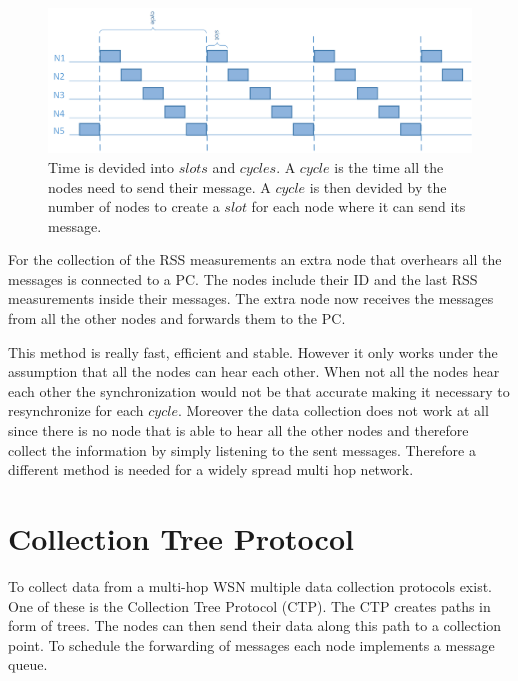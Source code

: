\begin{figure}[htbp]
	\centering
    \includegraphics[scale=0.8]{content/images/Multispin}
   	\caption{Time is devided into $slots$ and $cycles$. A $cycle$ is the time all the nodes need to send their message. A $cycle$ is then devided by the number of nodes to create a $slot$ for each node where it can send its message. \cite{RtiMulti}}
    \label{fig:multi}
\end{figure}

For the collection of the RSS measurements an extra node that overhears all the messages is connected to a PC. The nodes include their ID and the last RSS measurements inside their messages. The extra node now receives the messages from all the other nodes and forwards them to the PC.  \cite{RtiMulti}

This method is really fast, efficient and stable. However it only works under the assumption that all the nodes can hear each other. When not all the nodes hear each other the synchronization would not be that accurate making it necessary to resynchronize for each $cycle$. Moreover the data collection does not work at all since there is no node that is able to hear all the other nodes and therefore collect the information by simply listening to the sent messages.
Therefore a different method is needed for a widely spread multi hop network.

\section{Collection Tree Protocol}
To collect data from a multi-hop WSN multiple data collection protocols exist. One of these is the Collection Tree Protocol (CTP). The CTP creates paths in form of trees. The nodes can then send their data along this path to a collection point. To schedule the forwarding of messages each node implements a message queue. 

